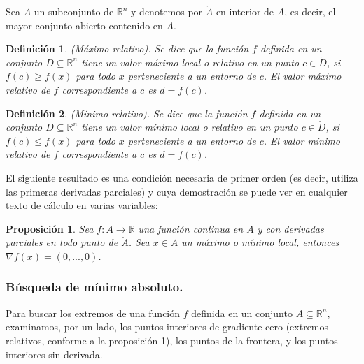 \documentclass[a4paper,11pt]{article}
\newtheorem{proposition}{Proposición}
\newtheorem{definition}{Definición}
\begin{document}
\noindent
Sea $A$ un subconjunto de $\mathbb{R}^n$ y denotemos por $\mathring{A}$ en interior de $A$, es decir, el mayor conjunto abierto contenido en $A$.
\begin{definition}
(Máximo relativo). Se dice que la función $f$ definida en un conjunto $D\subseteq \mathbb{R}^n$ tiene un valor máximo local o relativo en un punto $c\in\mathring{D}$, si $f(c)\geq f(x)$ para todo $x$ perteneciente a un entorno de $c$. El valor máximo relativo de $f$ correspondiente a $c$ es $d = f(c)$.
\end{definition}
\begin{definition}
(Mínimo relativo). Se dice que la función $f$ definida en un conjunto $D\subseteq \mathbb{R}^n$ tiene un valor mínimo local o relativo en un punto $c\in\mathring{D}$, si $f(c)\leq f(x)$ para todo $x$ perteneciente a un entorno de $c$. El valor mínimo relativo de $f$ correspondiente a $c$ es $d = f(c)$.
\end{definition}
El siguiente resultado es una condición necesaria de primer orden (es decir,
utiliza las primeras derivadas parciales) y cuya demostración se puede ver en
cualquier texto de cálculo en varias variables:

\begin{proposition}
Sea $ f : A \rightarrow \mathbb{R}$ una función continua en $A$ y con derivadas
parciales en todo punto de $\mathring{A}$. Sea $x\in A$ un máximo o mínimo local,
entonces $\nabla f(x)=(0,...,0)$.

\end{proposition}

\subsubsection{Búsqueda de mínimo absoluto.}
Para buscar los extremos de una función $f$ definida en un conjunto $A\subseteq \mathbb{R}^n$, examinamos, por un lado, los
puntos interiores de gradiente cero (extremos relativos, conforme a la proposición
1), los puntos de la frontera, y los puntos interiores sin derivada. \\
\end{document}
